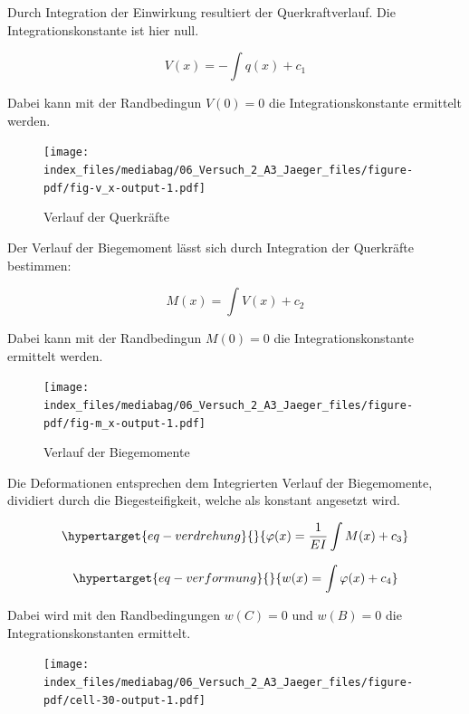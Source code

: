 \documentclass[
  12pt,
  letterpaper,
  egregdoesnotlikesansseriftitles]{scrreprt}
\begin{document}
Durch Integration der Einwirkung resultiert der Querkraftverlauf. Die
Integrationskonstante ist hier null.

\[
V(x) = -\int q(x) + c_1
\]

Dabei kann mit der Randbedingun \(V(0) = 0\) die Integrationskonstante
ermittelt werden.

\begin{figure}[H]

{\centering \texttt{[image: index\_files/mediabag/06\_Versuch\_2\_A3\_Jaeger\_files/figure-pdf/fig-v\_x-output-1.pdf]}

}

\caption{\label{fig-v_x}Verlauf der Querkräfte}

\end{figure}

Der Verlauf der Biegemoment lässt sich durch Integration der Querkräfte
bestimmen:

\[
M(x) = \int V(x) + c_2
\]

Dabei kann mit der Randbedingun \(M(0) = 0\) die Integrationskonstante
ermittelt werden.

\begin{figure}[H]

{\centering \texttt{[image: index\_files/mediabag/06\_Versuch\_2\_A3\_Jaeger\_files/figure-pdf/fig-m\_x-output-1.pdf]}

}

\caption{\label{fig-m_x}Verlauf der Biegemomente}

\end{figure}

Die Deformationen entsprechen dem Integrierten Verlauf der Biegemomente,
dividiert durch die Biegesteifigkeit, welche als konstant angesetzt
wird.

\begin{equation}\protect\hypertarget{eq-verdrehung}{}{
\varphi(x) = \frac{1}{EI}\int M(x) + c_3
}\label{eq-verdrehung}\end{equation}

\begin{equation}\protect\hypertarget{eq-verformung}{}{
w(x) = \int \varphi(x) + c_4
}\label{eq-verformung}\end{equation}

Dabei wird mit den Randbedingungen \(w(C) = 0\) und \(w(B) = 0\) die
Integrationskonstanten ermittelt.

\begin{figure}[H]

{\centering \texttt{[image: index\_files/mediabag/06\_Versuch\_2\_A3\_Jaeger\_files/figure-pdf/cell-30-output-1.pdf]}

}

\end{figure}
\end{document}
